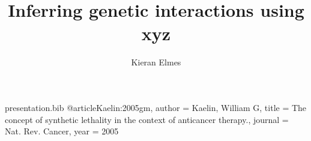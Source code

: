 \begin{filecontents*}{presentation.bib}
@article{Kaelin:2005gm,
	author = {Kaelin, William G},
	title = {{The concept of synthetic lethality in the context of anticancer therapy.}},
	journal = {Nat. Rev. Cancer},
	year = {2005}
}
\end{filecontents*}

\documentclass[8pt]{beamer}

\usepackage[style=numeric,firstinits=true,backend=biber]{biblatex}

\usepackage{todonotes}



\title{Inferring genetic interactions using xyz}
\author{Kieran Elmes}

\begin{frame}[plain]
    \maketitle
\end{frame}

